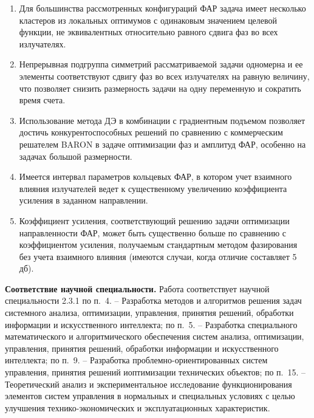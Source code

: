 {}
\begin{enumerate}[beginpenalty=10000] %
  \item Для большинства рассмотренных конфигураций ФАР задача имеет несколько кластеров из локальных оптимумов с одинаковым значением целевой функции, не эквивалентных относительно равного сдвига фаз во всех излучателях.
    \item Непрерывная подгруппа симметрий рассматриваемой задачи одномерна и ее элементы соответствуют сдвигу фаз во всех излучателях на равную величину, что позволяет снизить размерность задачи на одну переменную и сократить время счета.
   \item Использование метода ДЭ в комбинации с градиентным подъемом позволяет достичь конкурентоспособных решений по сравнению с   коммерческим решателем BARON в задаче оптимизации фаз и амплитуд ФАР, особенно на задачах большой размерности.
 \item Имеется интервал параметров кольцевых ФАР, в котором учет взаимного влияния излучателей ведет к существенному увеличению коэффициента усиления в заданном направлении.
  \item Коэффициент усиления, соответствующий решению задачи оптимизации направленности ФАР, может быть существенно больше по сравнению с коэффициентом усиления, получаемым стандартным методом фазирования без учета взаимного влияния (имеются случаи, когда отличие составляет 5 дб).
\end{enumerate}

{\textbf{Соответствие научной специальности.}} Работа соответствует
научной специальности 2.3.1 по п.~4. -- Разработка методов и алгоритмов решения задач системного анализа, оптимизации, управления, принятия решений, обработки информации и искусственного интеллекта; по п.~5. -- Разработка специального математического и алгоритмического обеспечения систем анализа, оптимизации, управления, принятия решений, обработки информации и искусственного интеллекта; по п.~9. -- Разработка проблемно-ориентированных систем управления, принятия решений иоптимизации технических объектов; по п.~15. -- Теоретический анализ и экспериментальное исследование функционирования элементов систем управления в нормальных и специальных условиях с целью улучшения технико-экономических и эксплуатационных характеристик.


